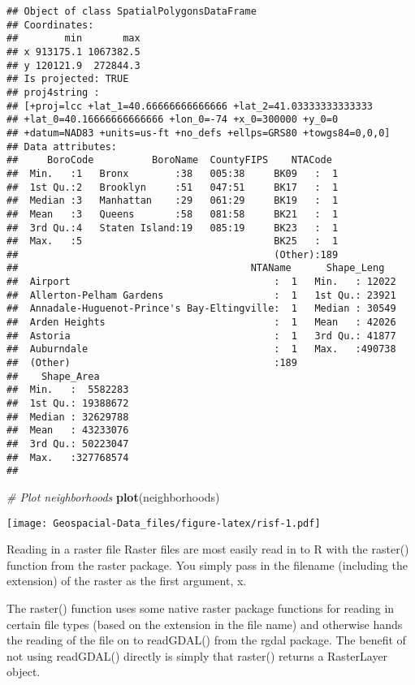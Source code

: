 \documentclass[]{article}
\newenvironment{Shaded}{\begin{snugshade}}{\end{snugshade}}
\newcommand{\CommentTok}[1]{\textcolor[rgb]{0.56,0.35,0.01}{\textit{#1}}}
\newcommand{\KeywordTok}[1]{\textcolor[rgb]{0.13,0.29,0.53}{\textbf{#1}}}
\newcommand{\NormalTok}[1]{#1}
\begin{document}
\begin{verbatim}
## Object of class SpatialPolygonsDataFrame
## Coordinates:
##        min       max
## x 913175.1 1067382.5
## y 120121.9  272844.3
## Is projected: TRUE 
## proj4string :
## [+proj=lcc +lat_1=40.66666666666666 +lat_2=41.03333333333333
## +lat_0=40.16666666666666 +lon_0=-74 +x_0=300000 +y_0=0
## +datum=NAD83 +units=us-ft +no_defs +ellps=GRS80 +towgs84=0,0,0]
## Data attributes:
##     BoroCode          BoroName  CountyFIPS    NTACode   
##  Min.   :1   Bronx        :38   005:38     BK09   :  1  
##  1st Qu.:2   Brooklyn     :51   047:51     BK17   :  1  
##  Median :3   Manhattan    :29   061:29     BK19   :  1  
##  Mean   :3   Queens       :58   081:58     BK21   :  1  
##  3rd Qu.:4   Staten Island:19   085:19     BK23   :  1  
##  Max.   :5                                 BK25   :  1  
##                                            (Other):189  
##                                        NTAName      Shape_Leng    
##  Airport                                   :  1   Min.   : 12022  
##  Allerton-Pelham Gardens                   :  1   1st Qu.: 23921  
##  Annadale-Huguenot-Prince's Bay-Eltingville:  1   Median : 30549  
##  Arden Heights                             :  1   Mean   : 42026  
##  Astoria                                   :  1   3rd Qu.: 41877  
##  Auburndale                                :  1   Max.   :490738  
##  (Other)                                   :189                   
##    Shape_Area       
##  Min.   :  5582283  
##  1st Qu.: 19388672  
##  Median : 32629788  
##  Mean   : 43233076  
##  3rd Qu.: 50223047  
##  Max.   :327768574  
## 
\end{verbatim}

\begin{Shaded}
\begin{Highlighting}[]
\CommentTok{# Plot neighborhoods}
\KeywordTok{plot}\NormalTok{(neighborhoods)}
\end{Highlighting}
\end{Shaded}

\texttt{[image: Geospacial-Data\_files/figure-latex/risf-1.pdf]}

Reading in a raster file Raster files are most easily read in to R with
the raster() function from the raster package. You simply pass in the
filename (including the extension) of the raster as the first argument,
x.

The raster() function uses some native raster package functions for
reading in certain file types (based on the extension in the file name)
and otherwise hands the reading of the file on to readGDAL() from the
rgdal package. The benefit of not using readGDAL() directly is simply
that raster() returns a RasterLayer object.
\end{document}
